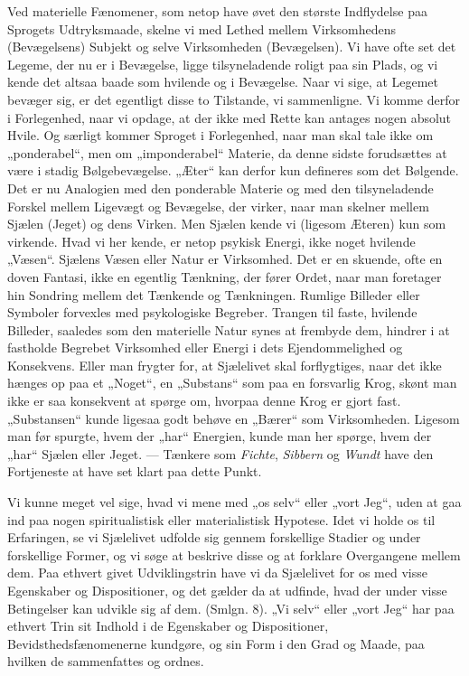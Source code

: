 \documentclass[12pt,a4paper]{book}
\newcommand{\apage}[1]{\marginnote{\footnotesize\textit{[#1]}}}
\begin{document}
Ved materielle Fænomener, som netop have øvet den største Indflydelse
paa Sprogets Udtryksmaade, skelne vi med Lethed mellem Virksomhedens
(Bevægelsens) Subjekt og selve Virksomheden (Bevægelsen). Vi have ofte
set det Legeme, der nu er i Bevægelse, ligge tilsyneladende roligt paa
sin Plads, og vi kende det altsaa baade som hvilende og i Bevægelse.
Naar vi sige, at Legemet bevæger sig, er det egentligt disse to
Tilstande, vi sammenligne. Vi komme derfor i Forlegenhed, naar vi
opdage, at der ikke med Rette kan antages nogen absolut Hvile. Og
særligt kommer Sproget i Forlegenhed, naar man skal tale ikke om
„ponderabel“, men om „imponderabel“ Materie, da denne sidste
forudsættes at være i stadig Bølgebevægelse. „Æter“ kan derfor kun
defineres som det Bølgende. Det er nu Analogien med den ponderable
Materie og med den tilsyneladende Forskel mellem Ligevægt og Bevægelse,
der virker, naar man skelner mellem Sjælen (Jeget) og dens Virken. Men
Sjælen kende vi (ligesom Æteren) kun som virkende. Hvad vi her kende,
er netop psykisk Energi, ikke noget hvilende „Væsen“. Sjælens Væsen
eller Natur er Virksomhed. Det er en skuende, ofte en doven Fantasi,
ikke en egentlig Tænkning, der fører Ordet, naar man foretager hin
Sondring mellem det Tænkende og Tænkningen. Rumlige Billeder eller
Symboler forvexles med psykologiske Begreber. Trangen til faste,
hvilende Billeder, saaledes som den materielle Natur synes at frembyde
dem, hindrer i at fastholde Begrebet Virksomhed eller Energi i dets
Ejendommelighed og Konsekvens. Eller man frygter for, at Sjælelivet
skal forflygtiges, naar det ikke hænges op paa et „Noget“, en
„Substans“ som paa en forsvarlig Krog, skønt man ikke er saa konsekvent
at spørge om, hvorpaa denne Krog er gjort fast. „Substansen“ kunde
ligesaa godt behøve en „Bærer“ som Virksomheden. Ligesom man \apage{36} før
spurgte, hvem der „har“ Energien, kunde man her spørge, hvem der „har“
Sjælen eller Jeget. --- Tænkere som \emph{Fichte}, \emph{Sibbern} og
\emph{Wundt} have den Fortjeneste at have set klart paa dette Punkt.

Vi kunne meget vel sige, hvad vi mene med „os selv“ eller „vort Jeg“,
uden at gaa ind paa nogen spiritualistisk eller materialistisk
Hypotese. Idet vi holde os til Erfaringen, se vi Sjælelivet udfolde sig
gennem forskellige Stadier og under forskellige Former, og vi søge at
beskrive disse og at forklare Overgangene mellem dem. Paa ethvert givet
Udviklingstrin have vi da Sjælelivet for os med visse Egenskaber og
Dispositioner, og det gælder da at udfinde, hvad der under visse
Betingelser kan udvikle sig af dem. (Smlgn. 8). „Vi selv“ eller „vort
Jeg“ har paa ethvert Trin sit Indhold i de Egenskaber og Dispositioner,
Bevidsthedsfænomenerne kundgøre, og sin Form i den Grad og Maade, paa
hvilken de sammenfattes og ordnes.
\end{document}
